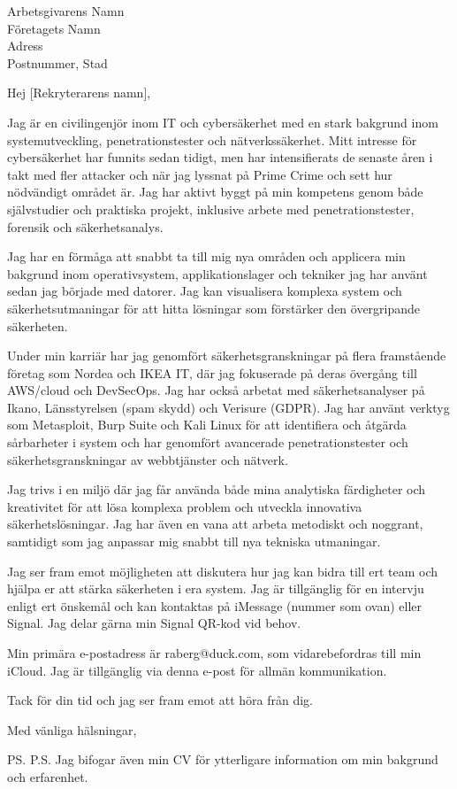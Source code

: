\documentclass[a4paper,12pt]{letter}
\date{\today} %
\begin{document}
\begin{letter}{Arbetsgivarens Namn \\ Företagets Namn \\ Adress \\ Postnummer, Stad}

\opening{Hej [Rekryterarens namn],}

Jag är en civilingenjör inom IT och cybersäkerhet med en stark bakgrund inom systemutveckling, penetrationstester och nätverkssäkerhet. Mitt intresse för cybersäkerhet har funnits sedan tidigt, men har intensifierats de senaste åren i takt med fler attacker och när jag lyssnat på Prime Crime och sett hur nödvändigt området är. Jag har aktivt byggt på min kompetens genom både självstudier och praktiska projekt, inklusive arbete med penetrationstester, forensik och säkerhetsanalys.

Jag har en förmåga att snabbt ta till mig nya områden och applicera min bakgrund inom operativsystem, applikationslager och tekniker jag har använt sedan jag började med datorer. Jag kan visualisera komplexa system och säkerhetsutmaningar för att hitta lösningar som förstärker den övergripande säkerheten.

Under min karriär har jag genomfört säkerhetsgranskningar på flera framstående företag som Nordea och IKEA IT, där jag fokuserade på deras övergång till AWS/cloud och DevSecOps. Jag har också arbetat med säkerhetsanalyser på Ikano, Länsstyrelsen (spam skydd) och Verisure (GDPR). Jag har använt verktyg som Metasploit, Burp Suite och Kali Linux för att identifiera och åtgärda sårbarheter i system och har genomfört avancerade penetrationstester och säkerhetsgranskningar av webbtjänster och nätverk.

Jag trivs i en miljö där jag får använda både mina analytiska färdigheter och kreativitet för att lösa komplexa problem och utveckla innovativa säkerhetslösningar. Jag har även en vana att arbeta metodiskt och noggrant, samtidigt som jag anpassar mig snabbt till nya tekniska utmaningar.

Jag ser fram emot möjligheten att diskutera hur jag kan bidra till ert team och hjälpa er att stärka säkerheten i era system. Jag är tillgänglig för en intervju enligt ert önskemål och kan kontaktas på iMessage (nummer som ovan) eller Signal. Jag delar gärna min Signal QR-kod vid behov.

Min primära e-postadress är raberg@duck.com, som vidarebefordras till min iCloud. Jag är tillgänglig via denna e-post för allmän kommunikation.

Tack för din tid och jag ser fram emot att höra från dig.

\closing{Med vänliga hälsningar,}

\ps{P.S. Jag bifogar även min CV för ytterligare information om min bakgrund och erfarenhet.}

\end{letter}
\end{document}
